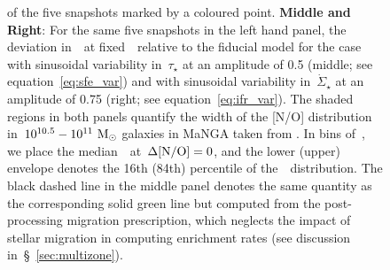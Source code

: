 \documentclass[ms.tex]{subfiles}
\begin{document}
\begin{figure}
{of the five snapshots marked by a coloured point.
\textbf{Middle and Right}: For the same five snapshots in the left hand panel,
the deviation in~\no~at fixed~\oh~relative to the fiducial model for the case
with sinusoidal variability in~$\tau_\star$ at an amplitude of 0.5 (middle; see
equation~\ref{eq:sfe_var})
and with sinusoidal variability in~$\dot{\Sigma}_\star$ at an amplitude of 0.75
(right; see equation~\ref{eq:ifr_var}).
The shaded regions in both panels quantify the width of the [N/O] distribution
in~$10^{10.5} - 10^{11}~\text{M}_\odot$ galaxies in MaNGA taken from
\citet{Schaefer2020}.
In bins of~\oh, we place the median~\no~at~$\Delta\text{[N/O]} = 0$, and the lower
(upper) envelope denotes the 16th (84th) percentile of the~\no~distribution.
The black dashed line in the middle panel denotes the same quantity as the
corresponding solid green line but computed from the post-processing migration
prescription, which neglects the impact of stellar migration in computing
enrichment rates (see discussion in~\S~\ref{sec:multizone}).
}
\label{fig:schaefer_comp}
\end{figure}
\end{document}
